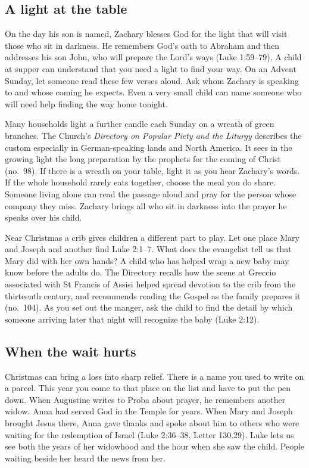 \subsection{A light at the table}

On the day his son is named, Zachary blesses God for the light that will
visit those who sit in darkness. He remembers God's oath to Abraham
and then addresses his son John, who will prepare the Lord's ways
(Luke 1:59--79). A child at supper
can understand that you need a light to find your way. On an Advent
Sunday, let someone read these few verses aloud. Ask whom Zachary is
speaking to and whose coming he expects. Even a very small child can
name someone who will need help finding the way home tonight.

Many households light a further candle each Sunday on a wreath of
green branches. The Church's \emph{Directory on Popular Piety and the
Liturgy} describes the custom especially in German-speaking lands and
North America. It sees in the growing light the long preparation by
the prophets for the coming of Christ (no.~98). If there is a wreath
on your table, light it as you hear Zachary's words. If the whole
household rarely eats together, choose the meal you do share. Someone
living alone can read the passage aloud and pray for the person whose
company they miss. Zachary brings all who sit in darkness into the
prayer he speaks over his child.

Near Christmas a crib gives children a different part to play. Let
one place Mary and Joseph and another find Luke 2:1--7. What does the
evangelist tell us that Mary did with her own hands? A child who has
helped wrap a new baby may know before the adults do. The Directory
recalls how the scene at Greccio associated with St Francis of Assisi
helped spread devotion to the crib from the thirteenth century, and
recommends reading the Gospel as the family prepares it (no.~104).
As you set out the manger, ask the child to find the detail by which
someone arriving later that night will recognize the baby (Luke 2:12).

\subsection{When the wait hurts}

Christmas can bring a loss into sharp relief. There is a name you
used to write on a parcel. This year you come to that place on the
list and have to put the pen down. When Augustine writes to Proba
about prayer, he remembers another widow. Anna had served God in
the Temple for years. When Mary and Joseph brought Jesus there,
Anna gave thanks and spoke about him to others who were waiting for
the redemption of Israel (Luke 2:36--38, Letter 130.29). Luke lets
us see both the years of her widowhood and the hour when she saw the
child. People waiting beside her heard the news from her.

